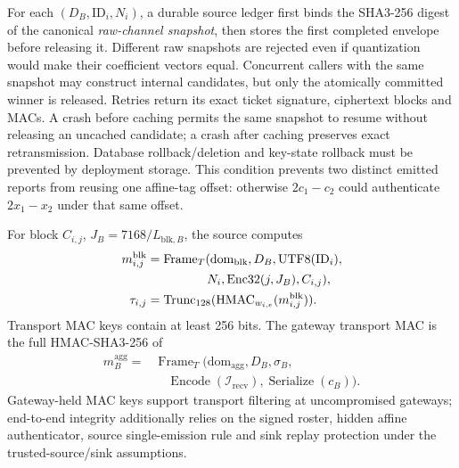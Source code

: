 For each $(D_B,\mathrm{ID}_i,N_i)$, a durable source ledger first binds the
SHA3-256 digest of the canonical \emph{raw-channel snapshot}, then stores the
first completed envelope before releasing it. Different raw snapshots are
rejected even if quantization would make their coefficient vectors equal.
Concurrent callers with the same snapshot may construct internal candidates,
but only the atomically committed winner is released. Retries return its exact
ticket signature, ciphertext blocks and MACs. A crash before caching permits
the same snapshot to resume without releasing an uncached candidate; a crash
after caching preserves exact retransmission. Database rollback/deletion and
key-state rollback must be prevented by deployment storage. This condition
prevents two distinct emitted reports from reusing one affine-tag offset:
otherwise $2c_1-c_2$ could authenticate $2x_1-x_2$ under that same offset.

For block $C_{i,j}$, $J_B=7168/L_{\mathrm{blk},B}$, the source computes
\begin{equation}
 \begin{aligned}
  m^{\mathrm{blk}}_{i,j}&=\operatorname{Frame}_T
  (\mathrm{dom}_{\mathrm{blk}},D_B,\operatorname{UTF8}(\mathrm{ID}_i),\\
  &\hspace{17mm}N_i,\operatorname{Enc32}(j,J_B),C_{i,j}),\\
  \tau_{i,j}&=\operatorname{Trunc}_{128}
                    (\operatorname{HMAC}_{w_{i,e}}(m^{\mathrm{blk}}_{i,j})).
 \end{aligned}
 \label{eq:daahe_protocol_block_mac}
\end{equation}
Transport MAC keys contain at least 256 bits. The gateway transport MAC is
the full HMAC-SHA3-256 of
\begin{equation}
 \begin{aligned}
 m^{\mathrm{agg}}_B={}&\operatorname{Frame}_T
       (\mathrm{dom}_{\mathrm{agg}},D_B,\sigma_B,\\
       &\quad\operatorname{Encode}(\mathcal{I}_{\mathrm{recv}}),
                                    \operatorname{Serialize}(c_B)).
 \end{aligned}
 \label{eq:daahe_protocol_aggregate_frame}
\end{equation}
Gateway-held MAC keys support transport filtering at uncompromised gateways;
end-to-end integrity additionally relies on the signed roster, hidden affine
authenticator, source single-emission rule and sink replay protection under the
trusted-source/sink assumptions.

